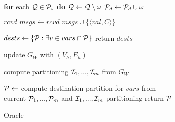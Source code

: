 \begin{algorithm}[t!]
\begin{distribalgo}[1]
	\vspace{1.0mm}
    \STATE \textbf{for} each $\mathcal{Q} \in \mathcal{P}_s$ \textbf{do} $\mathcal{Q} \leftarrow \mathcal{Q} \setminus \omega$
    \STATE $\mathcal{P}_d \leftarrow \mathcal{P}_d \cup \omega$
	\ENDINDENT

  \vspace{1.0mm}
    
		\STATE $rcvd\_msgs \leftarrow rcvd\_msgs \cup \{\langle val, C \rangle\}$
	\ENDINDENT
	
	\vspace{1.0mm}
		\STATE $dests \leftarrow \{ \mathcal{P} : \exists v \in vars \cap \mathcal{P} \}$
		\STATE return $dests$
	\ENDINDENT
	
		\vspace{1.0mm}


		\STATE update $G_W$ with $(V_h,E_h)$
	\ENDINDENT
	
	\vspace{1.0mm}
    
		\STATE compute partitioning $\mathcal{I}_1, ..., \mathcal{I}_m$ from $G_W$
	\ENDINDENT
	
	\vspace{1.0mm}
    
		\STATE $\mathcal{P} \leftarrow$ compute destination partition for $vars$ from\\ \hspace{8mm}current $\mathcal{P}_1, ..., \mathcal{P}_m$ and $\mathcal{I}_1, ..., \mathcal{I}_m$ partitioning
		\STATE return $\mathcal{P}$
	\ENDINDENT	
	

\caption{Oracle}
\label{alg:oracle_proxy}
\end{distribalgo}
\end{algorithm}



